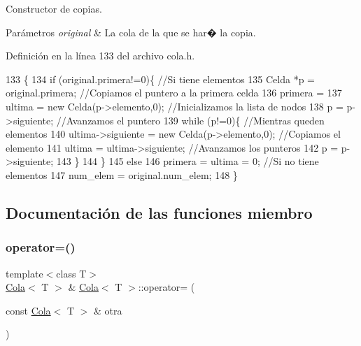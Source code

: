 Constructor de copias. 


\begin{DoxyParams}{Parámetros}
{\em original} & La cola de la que se har� la copia. \\
\hline
\end{DoxyParams}


Definición en la línea 133 del archivo cola.\+h.


\begin{DoxyCode}
133                                      \{
134   \textcolor{keywordflow}{if} (original.primera!=0)\{           \textcolor{comment}{//Si tiene elementos}
135     Celda *p = original.primera;      \textcolor{comment}{//Copiamos el puntero a la primera celda}
136     primera = 
137     ultima = \textcolor{keyword}{new} Celda(p->elemento,0); \textcolor{comment}{//Inicializamos la lista de nodos}
138     p = p->siguiente;                     \textcolor{comment}{//Avanzamos el puntero}
139     \textcolor{keywordflow}{while} (p!=0)\{                         \textcolor{comment}{//Mientras queden elementos}
140       ultima->siguiente = \textcolor{keyword}{new} Celda(p->elemento,0); \textcolor{comment}{//Copiamos el elemento}
141       ultima = ultima->siguiente;                   \textcolor{comment}{//Avanzamos los punteros}
142       p = p->siguiente;
143     \}
144   \}
145   \textcolor{keywordflow}{else}
146     primera = ultima = 0;            \textcolor{comment}{//Si no tiene elementos}
147   num\_elem = original.num\_elem;
148 \}
\end{DoxyCode}


\subsection{Documentación de las funciones miembro}
\mbox{\label{classCola_a2ac480681dec95b8ffeea075507849e2}} 
\subsubsection{\texorpdfstring{operator=()}{operator=()}}
{\footnotesize\ttfamily template$<$class T$>$ \\
\hyperlink{classCola}{Cola}$<$ T $>$ \& \hyperlink{classCola}{Cola}$<$ T $>$\+::operator= (\begin{DoxyParamCaption}\item[{const \hyperlink{classCola}{Cola}$<$ T $>$ \&}]{otra }\end{DoxyParamCaption})}



